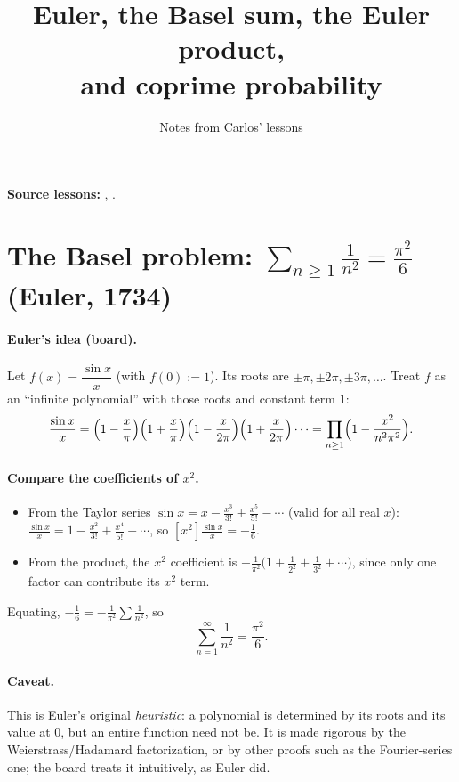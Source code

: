 \documentclass[11pt]{article}
\title{Euler, the Basel sum, the Euler product,\\ and coprime probability}
\author{Notes from Carlos' lessons}
\date{}
\begin{document}
\maketitle

\textbf{Source lessons:}
,
.

\section{The Basel problem: $\displaystyle\sum_{n\ge1}\frac1{n^2}=\frac{\pi^2}6$ (Euler, 1734)}

\paragraph{Euler's idea (board).} Let $f(x)=\dfrac{\sin x}{x}$ (with $f(0):=1$). Its roots are $\pm\pi,\pm2\pi,\pm3\pi,\dots$. Treat $f$ as an ``infinite polynomial'' with those roots and constant term $1$:
\[
\frac{\sin x}x=\Bigl(1-\frac x\pi\Bigr)\Bigl(1+\frac x\pi\Bigr)\Bigl(1-\frac x{2\pi}\Bigr)\Bigl(1+\frac x{2\pi}\Bigr)\cdots=\prod_{n\ge1}\Bigl(1-\frac{x^2}{n^2\pi^2}\Bigr).
\]

\paragraph{Compare the coefficients of $x^2$.}
\begin{itemize}[nosep]
  \item From the Taylor series $\sin x=x-\frac{x^3}{3!}+\frac{x^5}{5!}-\cdots$ (valid for all real $x$): $\frac{\sin x}x=1-\frac{x^2}{3!}+\frac{x^4}{5!}-\cdots$, so $[x^2]\frac{\sin x}x=-\frac16$.
  \item From the product, the $x^2$ coefficient is $-\frac1{\pi^2}\bigl(1+\frac1{2^2}+\frac1{3^2}+\cdots\bigr)$, since only one factor can contribute its $x^2$ term.
\end{itemize}
Equating, $-\frac16=-\frac1{\pi^2}\sum\frac1{n^2}$, so
\[
\boxed{\sum_{n=1}^\infty\frac1{n^2}=\frac{\pi^2}6}.
\]

\paragraph{Caveat.} This is Euler's original \emph{heuristic}: a polynomial is determined by its roots and its value at $0$, but an entire function need not be. It is made rigorous by the Weierstrass/Hadamard factorization, or by other proofs such as the Fourier-series one; the board treats it intuitively, as Euler did.
\end{document}
